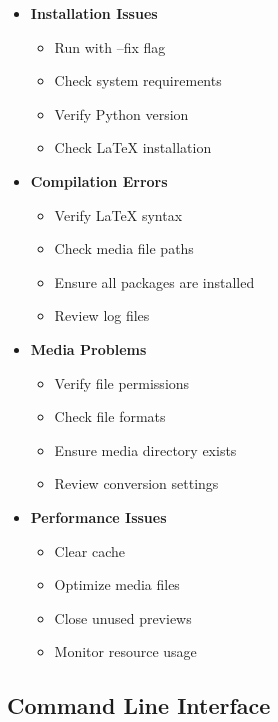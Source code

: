 \documentclass[11pt,a4paper]{article}
\begin{document}
\begin{tcolorbox}[title=Common Issues and Solutions]
\begin{itemize}
    \item \textbf{Installation Issues}
        \begin{itemize}
            \item Run with --fix flag
            \item Check system requirements
            \item Verify Python version
            \item Check LaTeX installation
        \end{itemize}
    \item \textbf{Compilation Errors}
        \begin{itemize}
            \item Verify LaTeX syntax
            \item Check media file paths
            \item Ensure all packages are installed
            \item Review log files
        \end{itemize}
    \item \textbf{Media Problems}
        \begin{itemize}
            \item Verify file permissions
            \item Check file formats
            \item Ensure media directory exists
            \item Review conversion settings
        \end{itemize}
    \item \textbf{Performance Issues}
        \begin{itemize}
            \item Clear cache
            \item Optimize media files
            \item Close unused previews
            \item Monitor resource usage
        \end{itemize}
\end{itemize}
\end{tcolorbox}

\subsection{Command Line Interface}
\end{document}
